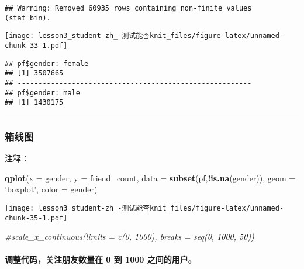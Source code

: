 \documentclass[]{article}
\newenvironment{Shaded}{\begin{snugshade}}{\end{snugshade}}
\newcommand{\CommentTok}[1]{\textcolor[rgb]{0.56,0.35,0.01}{\textit{#1}}}
\newcommand{\DataTypeTok}[1]{\textcolor[rgb]{0.13,0.29,0.53}{#1}}
\newcommand{\KeywordTok}[1]{\textcolor[rgb]{0.13,0.29,0.53}{\textbf{#1}}}
\newcommand{\NormalTok}[1]{#1}
\newcommand{\OperatorTok}[1]{\textcolor[rgb]{0.81,0.36,0.00}{\textbf{#1}}}
\newcommand{\StringTok}[1]{\textcolor[rgb]{0.31,0.60,0.02}{#1}}
\let\oldparagraph\paragraph
\renewcommand{\paragraph}[1]{\oldparagraph{#1}\mbox{}}
\begin{document}
\begin{verbatim}
## Warning: Removed 60935 rows containing non-finite values (stat_bin).
\end{verbatim}

\texttt{[image: lesson3\_student-zh\_-测试能否knit\_files/figure-latex/unnamed-chunk-33-1.pdf]}

\begin{Shaded}
\end{Shaded}

\begin{verbatim}
## pf$gender: female
## [1] 3507665
## -------------------------------------------------------- 
## pf$gender: male
## [1] 1430175
\end{verbatim}

\begin{center}\rule{0.5\linewidth}{\linethickness}\end{center}

\subsubsection{箱线图}

注释：

\begin{Shaded}
\begin{Highlighting}[]
\KeywordTok{qplot}\NormalTok{(}\DataTypeTok{x =}\NormalTok{ gender, }\DataTypeTok{y =}\NormalTok{ friend_count,}
      \DataTypeTok{data =} \KeywordTok{subset}\NormalTok{(pf,}\OperatorTok{!}\KeywordTok{is.na}\NormalTok{(gender)), }
      \DataTypeTok{geom =} \StringTok{'boxplot'}\NormalTok{, }\DataTypeTok{color =}\NormalTok{ gender) }
\end{Highlighting}
\end{Shaded}

\texttt{[image: lesson3\_student-zh\_-测试能否knit\_files/figure-latex/unnamed-chunk-35-1.pdf]}

\begin{Shaded}
\begin{Highlighting}[]
  \CommentTok{#scale_x_continuous(limits = c(0, 1000), breaks = seq(0, 1000, 50))}
\end{Highlighting}
\end{Shaded}

\hypertarget{-0--1000-}{%
\paragraph{调整代码，关注朋友数量在 0 到 1000
之间的用户。}\label{-0--1000-}}
\end{document}
